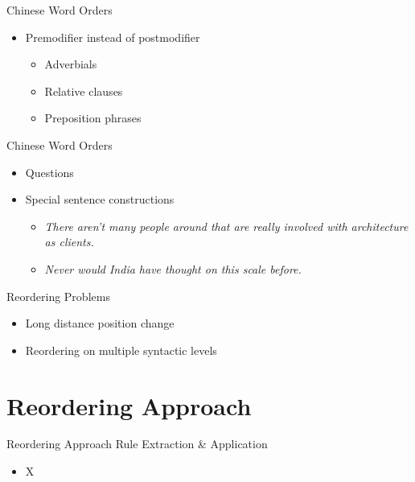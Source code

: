 \documentclass[18pt]{beamer}
\begin{document}
\begin{frame}{Chinese Word Orders}
\begin{itemize}
\item Premodifier instead of postmodifier
\begin{itemize}
	\item Adverbials
	\item Relative clauses
	\item Preposition phrases
\end{itemize}	
\end{itemize}
\begin{figure}
\centering

\end{figure}
\end{frame}

\begin{frame}{Chinese Word Orders}
\begin{itemize}
\item Questions
\item Special sentence constructions
\begin{itemize}
\item \textit{\alert{There aren't} many people around that are really involved with architecture as clients.}
\item \textit{\alert{Never would} India have thought on this scale before.}
\end{itemize}
\end{itemize}
\end{frame}

\begin{frame}{Reordering Problems}
\begin{itemize}
\item Long distance position change
\item Reordering on multiple syntactic levels
\end{itemize}
\end{frame}


\section{Reordering Approach}
\begin{frame}{Reordering Approach}
Rule Extraction \& Application
\begin{itemize}
\item X
\end{itemize}
\end{frame}
\end{document}
